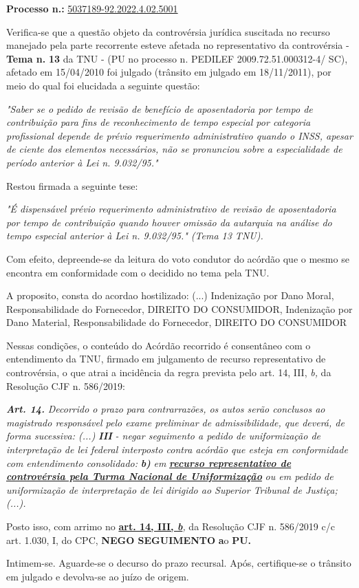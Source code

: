 \documentclass[12pt]{article}
\begin{document}
\justifying
\noindent \textbf{Processo n.: }\uline{5037189-92.2022.4.02.5001}

\noindent Verifica-se que a questão objeto da controvérsia jurídica suscitada no recurso manejado pela parte recorrente esteve afetada no representativo da controvérsia - \textbf{Tema n. }\textbf{13} da TNU - (PU no processo n. PEDILEF 2009.72.51.000312-4/ SC),  afetado em 15/04/2010 foi julgado (trânsito em julgado em 18/11/2011), por meio do qual foi elucidada a seguinte questão:

{\leftskip=3.1cm\rightskip=0.8cm\parindent=0pt \textit{"Saber se o pedido de revisão de benefício de aposentadoria por tempo de contribuição para fins de reconhecimento de tempo especial por categoria profissional depende de prévio requerimento administrativo quando o INSS, apesar de ciente dos elementos necessários, não se pronunciou sobre a especialidade de período anterior à Lei n. 9.032/95."}\par}

\noindent Restou firmada a seguinte tese:

{\leftskip=3.1cm\rightskip=0.8cm\parindent=0pt \textit{"É dispensável prévio requerimento administrativo de revisão de aposentadoria por tempo de contribuição quando houver omissão da autarquia na análise do tempo especial anterior à Lei n. 9.032/95." (Tema 13 TNU).}\par}

\noindent Com efeito, depreende-se da leitura do voto condutor do acórdão que o mesmo se encontra em conformidade com o decidido no  tema pela TNU.

\noindent A proposito, consta do acordao hostilizado: (...) Indenização por Dano Moral, Responsabilidade do Fornecedor, DIREITO DO CONSUMIDOR, Indenização por Dano Material, Responsabilidade do Fornecedor, DIREITO DO CONSUMIDOR

\noindent Nessas condições, o conteúdo do Acórdão recorrido é consentâneo com o entendimento da TNU, firmado em julgamento de recurso representativo de controvérsia, o que atrai a incidência da regra prevista pelo art. 14, III, \textit{b,} da Resolução CJF n. 586/2019:

\noindent \textit{\textbf{Art. 14.}}\textit{ Decorrido o prazo para contrarrazões, os autos serão conclusos ao magistrado responsável pelo exame preliminar de admissibilidade, que deverá, de forma sucessiva: (...) }\textit{\textbf{III }}\textit{- negar seguimento a pedido de uniformização de interpretação de lei federal interposto contra acórdão que esteja em conformidade com entendimento consolidado: }\textit{\textbf{b)}}\textit{ em }\textit{\textbf{\uline{recurso representativo de controvérsia pela Turma Nacional de Uniformização}}}\textit{ ou em pedido de uniformização de interpretação de lei dirigido ao Superior Tribunal de Justiça;(...).}

\noindent Posto isso, com arrimo no \textbf{\uline{art. 14, III, }}\textit{\textbf{\uline{b}}}\textit{,} da Resolução CJF n. 586/2019 c/c art. 1.030, I, do CPC, \textbf{NEGO SEGUIMENTO }\textbf{a}o\textbf{ PU}\textbf{.}

\noindent Intimem-se. Aguarde-se o decurso do prazo recursal. Após, certifique-se o trânsito em julgado e devolva-se ao juízo de origem.
\end{document}
